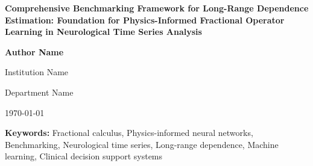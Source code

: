 \documentclass[11pt,a4paper]{article}
\begin{document}
\begin{titlepage}
\begin{center}
\vspace*{2cm}
{\Huge\bfseries Comprehensive Benchmarking Framework for Long-Range Dependence Estimation: Foundation for Physics-Informed Fractional Operator Learning in Neurological Time Series Analysis}

\vspace{1cm}
{\Large\bfseries Author Name}

\vspace{0.5cm}
{\large Institution Name}

\vspace{0.5cm}
{\large Department Name}

\vspace{1cm}
{\large \today}

\vspace{2cm}
\begin{abstract}

\end{abstract}

\vspace{1cm}
{\large \textbf{Keywords:} Fractional calculus, Physics-informed neural networks, Benchmarking, Neurological time series, Long-range dependence, Machine learning, Clinical decision support systems}

\end{center}
\end{titlepage}

\tableofcontents
\newpage

\listoffigures
\listoftables
\newpage













\appendix





\end{document}

